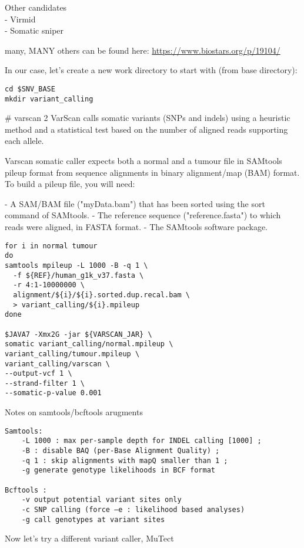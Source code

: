 Other candidates \\
- Virmid \\
- Somatic sniper

many, MANY others can be found here:
\url{https://www.biostars.org/p/19104/}


In our case, let's create a new work directory to start with (from base directory):

\begin{lstlisting}
cd $SNV_BASE
mkdir variant_calling
\end{lstlisting}

\# varscan 2
VarScan calls somatic variants (SNPs and indels) using a heuristic method and a statistical test based on the number of aligned reads supporting each allele.

Varscan somatic caller expects both a normal and a tumour file in SAMtools pileup format from sequence alignments in binary alignment/map (BAM) format. To build a pileup file, you will need:

- A SAM/BAM file ("myData.bam") that has been sorted using the sort command of SAMtools.
- The reference sequence ("reference.fasta") to which reads were aligned, in FASTA format.
- The SAMtools software package.


\begin{lstlisting}
for i in normal tumour
do
samtools mpileup -L 1000 -B -q 1 \
  -f ${REF}/human_g1k_v37.fasta \
  -r 4:1-10000000 \
  alignment/${i}/${i}.sorted.dup.recal.bam \
  > variant_calling/${i}.mpileup
done

$JAVA7 -Xmx2G -jar ${VARSCAN_JAR} \
somatic variant_calling/normal.mpileup \
variant_calling/tumour.mpileup \
variant_calling/varscan \
--output-vcf 1 \
--strand-filter 1 \
--somatic-p-value 0.001 
\end{lstlisting}

Notes on samtools/bcftools arugments
\begin{verbatim}
Samtools:
	-L 1000 : max per-sample depth for INDEL calling [1000] ; 
	-B : disable BAQ (per-Base Alignment Quality) ; 
	-q 1 : skip alignments with mapQ smaller than 1 ; 
	-g generate genotype likelihoods in BCF format

Bcftools :
	-v output potential variant sites only
	-c SNP calling (force –e : likelihood based analyses)
	-g call genotypes at variant sites
\end{verbatim}

Now let's try a different variant caller, MuTect \\

